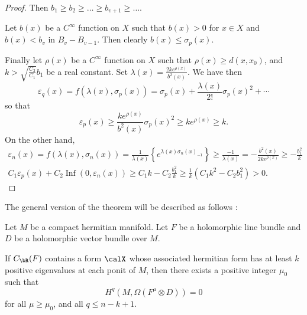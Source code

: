 \documentclass[lang=en,12pt]{beautybook}
\begin{document}
\begin{proof}
  Then $b_1 \geqslant b_2 \geqslant \ldots \geqslant b_{v+1} \geqslant \ldots$.

  Let $b(x)$ be a $C^{\infty}$ function on $X$ such that $b(x)>0$ for $x \in X$ and $b(x)<b_v$ in $B_v-B_{v-1}$. Then clearly $b(x) \leq \sigma_p(x)$.

  Finally let $\rho(x)$ be a $C^{\infty}$ function on $X$ such that $\rho(x) \geqslant d\left(x, x_0\right)$, and $k>\sqrt{\frac{C_2}{C_1}} b_1$ be a real constant. Set $\lambda(x)=\frac{2 k e^{\rho(x)}}{b^2(x)}$. We have then
  \begin{equation*}
    \varepsilon_q(x)=f\left(\lambda(x), \sigma_p(x)\right)=\sigma_p(x)+\frac{\lambda(x)}{2 !} \sigma_p(x)^2+\cdots
  \end{equation*}
  so that
  \begin{equation*}
    \varepsilon_p(x) \geqslant \frac{k e^{\rho(x)}}{b^2(x)} \sigma_p(x)^2 \geqslant k e^{\rho(x)} \geqslant k .
  \end{equation*}
  On the other hand,
  \begin{equation*}
    \begin{gathered}
      \varepsilon_n(x)=f\left(\lambda(x), \sigma_n(x)\right)=\frac{1}{\lambda(x)}\left\{e^{\lambda(x) \sigma_n(x)_{-1}}\right\} \geqslant \frac{-1}{\lambda(x)}=-\frac{b^2(x)}{2 k e^{\rho(x)}} \geqslant-\frac{b_1^2}{k} \\
      C_1 \varepsilon_p(x)+C_2 \operatorname{Inf}\left(0, \varepsilon_n(x)\right) \geqslant C_1 k-C_2 \frac{b_1^2}{k} \geqslant \frac{1}{k}\left(C_1 k^2-C_2 b_1^2\right)>0 .
    \end{gathered}
  \end{equation*}
\end{proof}

The general version of the theorem will be described as follows :
\begin{theorem}
  Let $M$ be a compact hermitian manifold. Let $F$ be a holomorphic line bundle and $D$ be a holomorphic vector bundle over $M$.

  If $C_\bR (F)$ contains a form $\calX$ whose associated hermitian form has at least $k$ positive eigenvalues at each ponit of $M$, then there exists a positive integer $\mu_0$ such that
  \[H^q(M,\Omega(F^\mu\otimes D))=0\]
  for all $\mu\geqslant \mu_0$, and all $q\leqslant n-k+1$.
\end{theorem}
\end{document}
